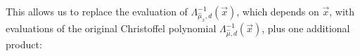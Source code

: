 \documentclass[pmlr]{jmlr}%
\begin{document}
%
%
This allows us to replace the evaluation of $\Lambda^{-1}_{\hat{\mu}_x, d}(\Vec{x})$, which depends on $\Vec{x}$, with evaluations of the original Christoffel polynomial $\Lambda^{-1}_{\hat{\mu}, d}(\Vec{x})$, plus one additional product:
\end{document}
